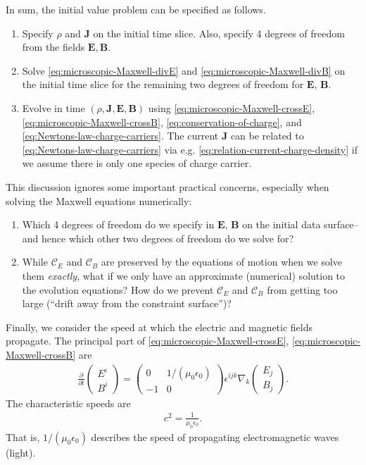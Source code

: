 \documentclass[12pt]{report}
\newcommand{\bB}{{\bm B}}
\newcommand{\bE}{{\bm E}}
\newcommand{\bJ}{{\bm J}}
\begin{document}
In sum, the initial value problem can be specified as follows.
\begin{enumerate}
    \item Specify $\rho$ and $\bJ$ on the initial time slice. Also, specify 4 degrees of freedom from the fields $\bE, \bB$.
    \item Solve \eqref{eq:microscopic-Maxwell-divE} and \eqref{eq:microscopic-Maxwell-divB} on the initial time slice for the remaining two degrees of freedom for $\bE$, $\bB$.
    \item Evolve in time $(\rho,\bJ,\bE,\bB)$ using \eqref{eq:microscopic-Maxwell-crossE}, \eqref{eq:microscopic-Maxwell-crossB}, \eqref{eq:conservation-of-charge}, and \eqref{eq:Newtons-law-charge-carriers}. 
        The current $\bJ$ can be related to \eqref{eq:Newtons-law-charge-carriers} via e.g. \eqref{eq:relation-current-charge-density} if we assume there is only one species of charge carrier.

\end{enumerate}
This discussion ignores some important practical concerns, especially when solving the Maxwell equations numerically:
\begin{enumerate}
    \item Which 4 degrees of freedom do we specify in $\bE$, $\bB$ on the initial data surface--and hence which other two degrees of freedom do we solve for?
    \item While $\mathcal{C}_E$ and $\mathcal{C}_B$ are preserved by the equations of motion when we solve them \emph{exactly}, what if we only have an approximate (numerical) solution to the evolution equations?
        How do we prevent $\mathcal{C}_E$ and $\mathcal{C}_B$ from getting too large (``drift away from the constraint surface'')?
\end{enumerate}

Finally, we consider the speed at which the electric and magnetic fields propagate.
The principal part of \eqref{eq:microscopic-Maxwell-crossE}, \eqref{eq:microscopic-Maxwell-crossB} are
\begin{align}
    \frac{\partial}{\partial t}\begin{pmatrix} E^i \\ B^i \end{pmatrix}
    =
    \begin{pmatrix}
        0 & 1/\left(\mu_0\epsilon_0\right)
        \\
        - 1 & 0
    \end{pmatrix}
    \epsilon^{ijk}\nabla_k
    \begin{pmatrix} E_j \\ B_j \end{pmatrix}
        .
\end{align}
The characteristic speeds are
\begin{align}
    c^2
    =
    \frac{1}{\mu_0\epsilon_0}
    .
\end{align}
That is, $1/\left(\mu_0\epsilon_0\right)$ describes the speed of propagating electromagnetic waves (light).
\end{document}
